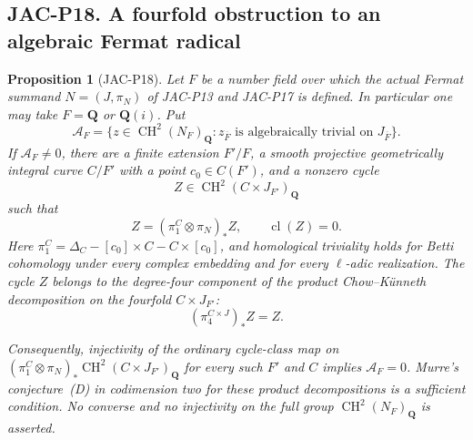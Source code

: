 \documentclass[11pt,a4paper]{article}
\newtheorem{proposition}[theorem]{Proposition}
\begin{document}
\subsection*{JAC-P18. A fourfold obstruction to an algebraic Fermat radical}

\begin{proposition}[JAC-P18]\label{jac:P18}
Let $F$ be a number field over which the actual Fermat summand
$N=(J,\pi_N)$ of JAC-P13 and JAC-P17 is defined. In particular one
may take $F=\mathbf Q$ or $\mathbf Q(i)$. Put
\[
 \mathcal A_F=\{z\in\operatorname{CH}^2(N_F)_{\mathbf Q}:
       z_{\overline F}\text{ is algebraically trivial on }
       J_{\overline F}\}.
\]
If $\mathcal A_F\ne0$, there are a finite extension $F'/F$, a
smooth projective geometrically integral curve $C/F'$ with a point
$c_0\in C(F')$, and a nonzero cycle
\[
 Z\in\operatorname{CH}^2(C\times J_{F'})_{\mathbf Q}
\]
such that
\[
  Z=(\pi_1^C\otimes\pi_N)_*Z,
       \qquad \operatorname{cl}(Z)=0.
                                                        \tag{P18.1}
\]
Here
$\pi_1^C=\Delta_C-[c_0]\times C-C\times[c_0]$,
and homological triviality holds for Betti cohomology under every
complex embedding and for every $\ell$-adic realization.
The cycle $Z$ belongs to the degree-four component of the product
Chow--K\"unneth decomposition on the fourfold $C\times J_{F'}$:
\[
                 (\pi_4^{C\times J})_*Z=Z.             \tag{P18.2}
\]

Consequently, injectivity of the ordinary cycle-class map on
$(\pi_1^C\otimes\pi_N)_*\operatorname{CH}^2(C\times J_{F'})_{
\mathbf Q}$ for every such $F'$ and $C$ implies
$\mathcal A_F=0$. Murre's conjecture~(D) in codimension two for
these product decompositions is a sufficient condition. No
converse and no injectivity on the full group
$\operatorname{CH}^2(N_F)_{\mathbf Q}$ is asserted.
\end{proposition}
\end{document}
